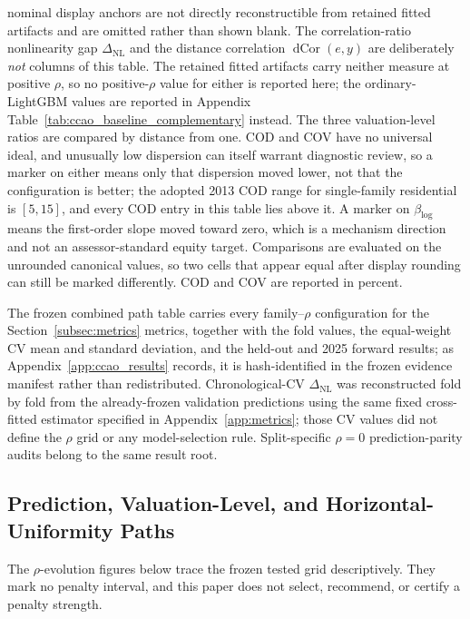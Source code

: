 \documentclass[10pt]{article}
\theoremstyle{definition}
\newcommand{\1}{\mathbf{1}}
\begin{document}
\begin{table}[!htbp]
\begin{minipage}{\textwidth}
nominal display anchors are not directly reconstructible from retained fitted artifacts and are
omitted rather than shown blank.
The correlation-ratio nonlinearity gap $\Delta_{\mathrm{NL}}$ and the distance correlation
$\operatorname{dCor}(e,y)$ are deliberately \emph{not} columns of this table. The retained fitted
artifacts carry neither measure at positive $\rho$, so no positive-$\rho$ value for either is reported
here; the ordinary-LightGBM values are reported in Appendix
Table~\ref{tab:ccao_baseline_complementary} instead.
The three valuation-level ratios are compared by distance from one. COD and COV have no universal
ideal, and unusually low dispersion can itself warrant diagnostic review, so a marker on either means
only that dispersion moved lower, not that the configuration is better; the adopted 2013 COD range
for single-family residential is $[5,15]$, and every COD entry in this table lies above it. A marker
on $\beta_{\log}$ means the first-order slope moved toward zero, which is a mechanism direction and
not an assessor-standard equity target. Comparisons are evaluated on the unrounded canonical values,
so two cells that appear equal after display rounding can still be marked differently. COD and COV
are reported in percent.
\end{minipage}
\end{table}


The frozen combined path table carries every family--$\rho$ configuration for the Section~\ref{subsec:metrics} metrics, together with the fold values, the equal-weight CV mean and standard deviation, and the held-out and 2025 forward results; as Appendix~\ref{app:ccao_results} records, it is hash-identified in the frozen evidence manifest rather than redistributed. Chronological-CV $\Delta_{\mathrm{NL}}$ was reconstructed fold by fold from the already-frozen validation predictions using the same fixed cross-fitted estimator specified in Appendix~\ref{app:metrics}; those CV values did not define the $\rho$ grid or any model-selection rule. Split-specific $\rho=0$ prediction-parity audits belong to the same result root.


\subsection{Prediction, Valuation-Level, and Horizontal-Uniformity Paths}


The $\rho$-evolution figures below trace the frozen tested grid descriptively. They mark no penalty interval, and this paper does not select, recommend, or certify a penalty strength.
\end{document}

